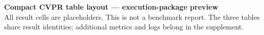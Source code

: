 \documentclass[10pt,letterpaper]{article}
\begin{document}
\noindent\textbf{Compact CVPR table layout --- execution-package preview}\\[3pt]
\noindent All result cells are placeholders. This is not a benchmark report.
The three tables share result identities; additional metrics and logs belong in the supplement.



\end{document}
